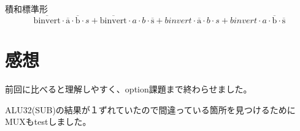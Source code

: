 \documentclass{jarticle}
\begin{document}
  {\large 積和標準形}
  \[
   \overline{\mbox{binvert}} \cdot \overline{\mbox{a}} \cdot \overline{\mbox{b}} \cdot s +
   \overline{\mbox{binvert}} \cdot a \cdot b \cdot \overline{\mbox{s}} +
   binvert \cdot \overline{\mbox{a}} \cdot b \cdot s +
   binvert \cdot a \cdot \overline{\mbox{b}} \cdot \overline{\mbox{s}}
  \]
  \section{感想}
  前回に比べると理解しやすく、option課題まで終わらせました。

  ALU32(SUB)の結果が１ずれていたので間違っている箇所を見つけるためにMUXもtestしました。
\end{document}
